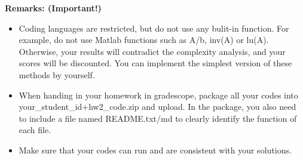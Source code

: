 \documentclass[english,onecolumn]{IEEEtran}
\begin{document}
\begin{enumerate}
\noindent\textbf{Remarks: (Important!)}
\begin{itemize}
    \item Coding languages are restricted, but do not use any bulit-in function. For example, do not use {\sf Matlab} functions such as {\sf A/b}, {\sf inv(A)} or {\sf lu(A)}. Otherwise, your results will contradict the complexity analysis, and your scores will be discounted. You can implement the simplest version of these methods by yourself.
    \item When handing in your homework in gradescope, package all your codes into {\sf your\_student\_id+hw2\_code.zip} and upload. In the package, you also need to include a file named {\sf README.txt/md} to clearly identify the function of each file.
     \item Make sure that your codes can run and are consistent with your solutions.
\end{itemize}
\end{enumerate} 
\end{document}
